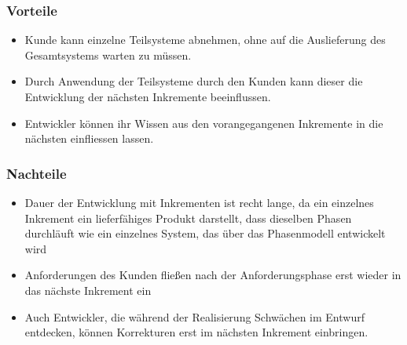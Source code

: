 \subsubsection*{Vorteile}

\begin{itemize}
    \item Kunde kann einzelne Teilsysteme abnehmen, ohne auf die Auslieferung des Gesamtsystems warten zu müssen.
    \item Durch Anwendung der Teilsysteme durch den Kunden kann dieser die Entwicklung der nächsten Inkremente beeinflussen.
    \item Entwickler können ihr Wissen aus den vorangegangenen Inkremente in die nächsten einfliessen lassen.
\end{itemize}

\subsubsection*{Nachteile}

\begin{itemize}
    \item Dauer der Entwicklung mit Inkrementen ist recht lange, da ein einzelnes Inkrement ein lieferfähiges Produkt darstellt, dass dieselben Phasen durchläuft wie ein einzelnes System, das über das Phasenmodell entwickelt wird
    \item Anforderungen des Kunden fließen nach der Anforderungsphase erst wieder in das nächste Inkrement ein
    \item Auch Entwickler, die während der Realisierung Schwächen im Entwurf entdecken, können Korrekturen erst im nächsten Inkrement einbringen.
\end{itemize}